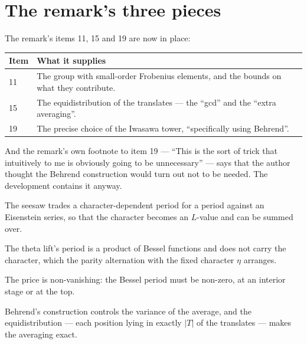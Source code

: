 \section{The remark's three pieces}The remark's items 11, 15 and 19 are now in place:

\begin{center}
\begin{tabular}{@{}>{\RaggedRight\arraybackslash\hyphenpenalty=10000\exhyphenpenalty=10000}p{}>{\RaggedRight\arraybackslash\hyphenpenalty=10000\exhyphenpenalty=10000}p{}@{}}
\toprule
\textbf{Item} & \textbf{What it supplies} \\
\midrule
11 & The group with small-order Frobenius elements, and the bounds on what
they contribute. \\
15 & The equidistribution of the translates --- the ``gcd'' and the
``extra averaging''. \\
19 & The precise choice of the Iwasawa tower, ``specifically using
Behrend''. \\
\bottomrule
\end{tabular}
\end{center}

And the remark's own footnote to item 19 --- ``This is the sort of trick that
intuitively to me is obviously going to be unnecessary'' --- says that the
author thought the Behrend construction would turn out not to be needed. The
development contains it anyway.

\begin{keytakeaways}
\item The seesaw trades a character-dependent period for a period against an
Eisenstein series, so that the character becomes an $L$-value and can be
summed over.
\item The theta lift's period is a product of Bessel functions and does not
carry the character, which the parity alternation with the fixed character
$\eta$ arranges.
\item The price is non-vanishing: the Bessel period must be non-zero, at an
interior stage or at the top.
\item Behrend's construction controls the variance of the average, and the
equidistribution  --- each position lying in exactly
$|T|$ of the translates --- makes the averaging exact.
\end{keytakeaways}
